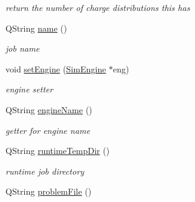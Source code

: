 \begin{DoxyCompactItemize}
\begin{DoxyCompactList}\small\item\em return the number of charge distributions this has \end{DoxyCompactList}\item 
Q\+String \hyperlink{classprim_1_1SimJob_a6815cd43fcb615fb3278b14963f7e1bf}{name} ()\hypertarget{classprim_1_1SimJob_a6815cd43fcb615fb3278b14963f7e1bf}{}\label{classprim_1_1SimJob_a6815cd43fcb615fb3278b14963f7e1bf}

\begin{DoxyCompactList}\small\item\em job name \end{DoxyCompactList}\item 
void \hyperlink{classprim_1_1SimJob_a2b70985dc89bed24bbd973b534097182}{set\+Engine} (\hyperlink{classprim_1_1SimEngine}{Sim\+Engine} $\ast$eng)\hypertarget{classprim_1_1SimJob_a2b70985dc89bed24bbd973b534097182}{}\label{classprim_1_1SimJob_a2b70985dc89bed24bbd973b534097182}

\begin{DoxyCompactList}\small\item\em engine setter \end{DoxyCompactList}\item 
Q\+String \hyperlink{classprim_1_1SimJob_a59eeb5d7f3dc2321a28ff64c7f0e5d30}{engine\+Name} ()\hypertarget{classprim_1_1SimJob_a59eeb5d7f3dc2321a28ff64c7f0e5d30}{}\label{classprim_1_1SimJob_a59eeb5d7f3dc2321a28ff64c7f0e5d30}

\begin{DoxyCompactList}\small\item\em getter for engine name \end{DoxyCompactList}\item 
Q\+String \hyperlink{classprim_1_1SimJob_a3ba622974e6ce3b5ccb0d3afea2b8490}{runtime\+Temp\+Dir} ()\hypertarget{classprim_1_1SimJob_a3ba622974e6ce3b5ccb0d3afea2b8490}{}\label{classprim_1_1SimJob_a3ba622974e6ce3b5ccb0d3afea2b8490}

\begin{DoxyCompactList}\small\item\em runtime job directory \end{DoxyCompactList}\item 
Q\+String \hyperlink{classprim_1_1SimJob_a9ae0bdcc7d55e3c45a8c37c519e44ff5}{problem\+File} ()\hypertarget{classprim_1_1SimJob_a9ae0bdcc7d55e3c45a8c37c519e44ff5}{}\label{classprim_1_1SimJob_a9ae0bdcc7d55e3c45a8c37c519e44ff5}


\end{DoxyCompactItemize}
